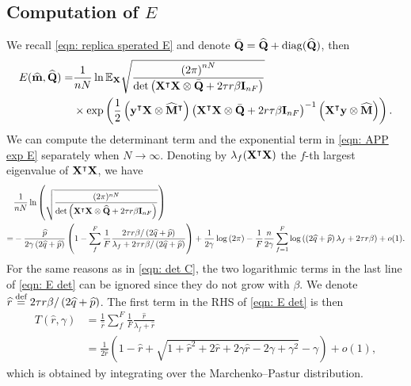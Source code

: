 \documentclass[9pt,twocolumn]{pnas-new}
\begin{document}
\subsection{Computation of $E$}\label{APP: E}
We recall \eqref{eqn: replica sperated E} and denote $\bar{\mathbf{Q}}=\widehat{\mathbf{Q}}+\mathrm{diag}(\widehat{\mathbf{Q}})$, then
\begin{equation}\label{eqn: APP exp E}
\begin{aligned}
    E(\widehat{\mathbf{m}},\widehat{\mathbf{Q}})=& \frac{1}{nN}\ln \mathbb{E}_{\mathbf{X}} \sqrt{ \frac{\left(2\pi\right)^{n N}}{\det\left(\mathbf{X}^{\intercal}\mathbf{X} \otimes \bar{\mathbf{Q}}+ 2 \tau r\beta \mathbf{I}_{n F}\right)}}\\ &\times \exp\left(\frac{1}{2}\left(\mathbf{y}^{\intercal}\mathbf{X} \otimes\widehat{\mathbf{M}}^{\intercal}\right)\left( \mathbf{X}^{\intercal}\mathbf{X}\otimes \bar{\mathbf{Q}}+2 r \tau \beta \mathbf{I}_{n F}\right)^{-1}\left(\mathbf{X}^{\intercal}\mathbf{y}\otimes\widehat{\mathbf{M}}\right)\right).
\end{aligned}
\end{equation} 
We can compute the determinant term and the exponential term in \eqref{eqn: APP exp E} separately when $N\to\infty$. Denoting by $\lambda_f(\mathbf{X}^\intercal \mathbf{X})$ the $f$-th largest eigenvalue of $\mathbf{X}^\intercal \mathbf{X}$, we have
\begin{equation}\label{eqn: E det}
\begin{aligned}
        &\frac{1}{nN }\ln \left(\sqrt{\frac{(2\pi)^{n N}}{\det \left(\mathbf{X}^\intercal \mathbf{X} \otimes  \widehat{\mathbf{Q}}  +2 \tau r \beta \mathbf{I}_{n F} \right)} }\right)\\
         = & -\frac{  \widehat{p} }{2\gamma \left(2\widehat{q}+\widehat{p}\right)} \left(1-\sum_f^F\frac{1}{F} \frac{2\tau r\beta/\left(2\widehat{q}+\widehat{p}\right)}{\lambda_{f}+ 2\tau r\beta/\left(2\widehat{q}+\widehat{p}\right)}\right)+\frac{1 }{2\gamma}\log\left(2\pi\right)-\frac{1}{F}\frac{n }{2\gamma}\sum_{f=1}^F\log\left(\left(2\widehat{q}+\widehat{p}\right) \lambda_f+2\tau r\beta\right)+o(1).
\end{aligned}
\end{equation}
For the same reasons as in \eqref{eqn: det C}, the two logarithmic terms in the last line of \eqref{eqn: E det} can be ignored since they do not grow with $\beta$. We denote $\widehat{r} \overset{\text{def}}{=} 2\tau r\beta/\left(2\widehat{q}+\widehat{p}\right)$. The first term in the RHS of \eqref{eqn: E det} is then 
\begin{equation}\label{eqn: APP define T}
\begin{aligned}
T(\widehat{r},\gamma)
&= \frac{1}{\widehat{r}}\sum_f^F\frac{1}{F} \frac{\widehat{r}}{\lambda_{f} + \widehat{r}}\\
&= \frac{1}{2\widehat{r}}\left(1-\widehat{r}+\sqrt{1+\widehat{r}^{2}+2\widehat{r}+2\gamma \widehat{r}-2\gamma+\gamma^{2}}-\gamma\right)+o(1),
\end{aligned}
\end{equation}
which is obtained by integrating over the Marchenko--Pastur distribution. 
\end{document}

